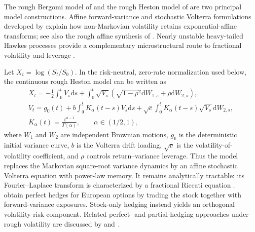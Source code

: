 \documentclass[11pt]{article}
\theoremstyle{definition}
\theoremstyle{remark}
\newcommand{\1}{\mathbf{1}}
\newcommand{\dd}{\mathrm{d}}
\begin{document}
The rough Bergomi model of \citet{bayerfrizgatheral2016} and the rough Heston
model of \citet{eleuchrosenbaum2019} are two principal model constructions.
Affine forward-variance and stochastic Volterra formulations developed by
\citet{gatheralkellerressel2019,abijaberlarssonpulido2019} explain how
non-Markovian volatility retains exponential-affine transforms; see also the
rough affine synthesis of \citet{kellerressellarssonpulido2023}. Nearly
unstable heavy-tailed Hawkes processes provide a complementary
microstructural route to fractional volatility and leverage
\citep{jaissonrosenbaum2016,eleuchfukasawarosenbaum2018}.

Let $X_t=\log(S_t/S_0)$. In the risk-neutral, zero-rate normalization used
below, the continuous rough Heston model can be written as
\begin{equation}
\label{eq:intro-rough-heston}
\begin{aligned}
 &X_t
 = -\frac12\int_0^t V_s\dd s
    +\int_0^t\sqrt{V_s}
      \left(\sqrt{1-\rho^2}\dd W_{1,s}+\rho\dd W_{2,s}\right),\\
 &V_t
 =g_0(t)+b\int_0^tK_\alpha(t-s)V_s\dd s
   +\sqrt c\int_0^tK_\alpha(t-s)\sqrt{V_s}\dd W_{2,s},\\
 &K_\alpha(t)=\frac{t^{\alpha-1}}{\Gamma(\alpha)},
 \qquad \alpha\in(1/2,1),
\end{aligned}
\end{equation}
where $W_1$ and $W_2$ are independent Brownian motions, $g_0$ is the
deterministic initial variance curve, $b$ is the Volterra drift loading,
$\sqrt c$ is the volatility-of-volatility coefficient, and $\rho$ controls
return--variance leverage. Thus the model replaces the Markovian square-root
variance dynamics by an affine stochastic Volterra equation with power-law
memory. It remains analytically tractable: its Fourier--Laplace transform is
characterized by a fractional Riccati equation
\citep{eleuchrosenbaum2019,abijaberlarssonpulido2019}.
\citet{eleuchrosenbaum2018} obtain perfect hedges for European options by
trading the stock together with forward-variance exposures. Stock-only
hedging instead yields an orthogonal volatility-risk component. Related
perfect- and partial-hedging approaches
under rough volatility are discussed by \citet{fukasawahorvathtankov2021} and
\citet{motte2024partial}.
\end{document}
